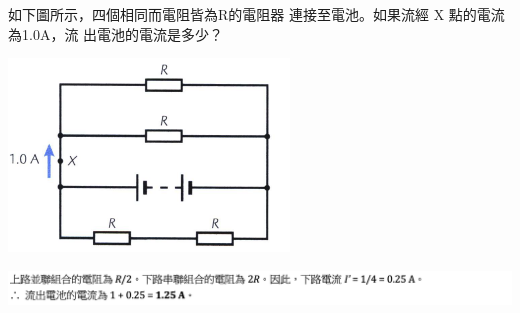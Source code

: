 {
    如下圖所示，四個相同而電阻皆為R的電阻器 連接至電池。如果流經 X 點的電流為1.0A，流 出電池的電流是多少？
    \par{\par\centering\includegraphics[width=.35\textwidth]{./img/ch2_circuit_lq_2024-06-14-14-13-12.png}\par}
}{
    \par{\par\centering\includegraphics[width=\textwidth]{./img/ch2_circuit_lq_2024-06-16-12-13-41.png}\par}
}


